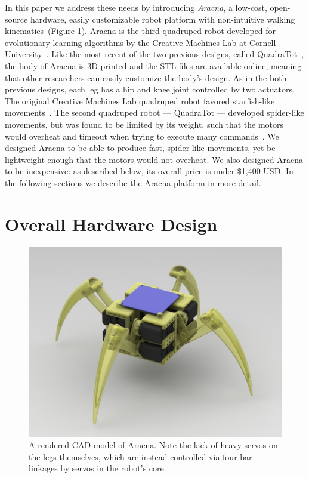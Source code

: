 \documentclass[letterpaper]{article}
\begin{document}
In this paper we address these needs by introducing \emph{Aracna}, a low-cost, open-source hardware, easily customizable robot platform with non-intuitive walking
kinematics~(Figure 1). Aracna is the third quadruped robot developed for evolutionary learning algorithms by the Creative Machines Lab at Cornell University~\citep{bongard2006resilient, yosinski2011gaits}. Like the most recent of the two previous designs, called QuadraTot~\citep{yosinski2011gaits}, the body of Aracna is 3D printed and the STL files are available online,
meaning that other researchers can easily customize the body's design. As in the both previous designs, each leg has a hip and knee joint controlled by two actuators. The original Creative
Machines Lab quadruped robot favored starfish-like movements~\citep{bongard2006resilient}. The second quadruped robot --- QuadraTot ---
developed spider-like movements, but was found to be limited by its
weight, such that the motors would overheat and timeout when trying to execute many commands~\citep{yosinski2011gaits, Glette2012Evolution}. We designed Aracna to be able to produce fast, spider-like movements, yet be lightweight enough that the motors would not overheat. We also designed Aracna to be inexpensive: as described below, its overall price is under \$1,400  USD. In the following sections we describe the Aracna platform in more detail. 




\section{Overall Hardware Design}

\begin{figure}[t]
\begin{center}
\includegraphics[width=\columnwidth]{fig5.jpg}
\caption{A rendered CAD model of Aracna. Note the lack of heavy servos on the legs themselves, which are instead controlled via four-bar linkages by servos in the robot's core.}
\label{cadModelOfRobot}
\end{center}
\end{figure}
\end{document}
